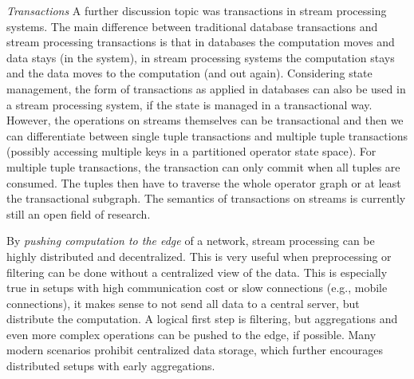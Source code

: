 \emph{Transactions} A further discussion topic was transactions in stream processing systems.
The main difference between traditional database transactions and stream
processing transactions is that in databases the computation moves and
data stays (in the system), in stream processing systems the computation stays
and the data moves to the computation (and out again). Considering state management, the form of transactions as applied in databases
can also be used in a stream processing system, if the state is managed in a
transactional way. However, the operations on streams themselves can be
transactional and then we can differentiate between single tuple transactions
and multiple tuple transactions (possibly accessing multiple keys in a partitioned operator state space). For multiple tuple transactions, the
transaction can only commit when all tuples are consumed. The tuples then have
to traverse the whole operator graph or at least the transactional subgraph. The semantics of transactions on streams is currently still an open
field of research.

By \emph{pushing computation to the edge} of a network, stream processing can
be highly distributed and decentralized. This is very useful when preprocessing
or filtering can be done without a centralized view of the data. This is especially true in
setups with high communication cost or slow connections (e.g., mobile
connections), it makes sense to not send all data to a central server, but
distribute the computation. A logical first step is filtering, but aggregations
and even more complex operations can be pushed to the edge, if possible. Many
modern scenarios prohibit centralized data storage, which further encourages
distributed setups with early aggregations. \iffalse Primary points of research are the
declarativity for specifying highly distributed data processing programs and
the architecture of systems to support these use cases.\fi

\iffalse
\emph{Other topics discussed} were ad hoc queries and graph stream processing.
Most current systems only discuss long running queries, but in many use cases
(e.g., sports, automotive) streams can be short lived as can be stream queries.
\fi 